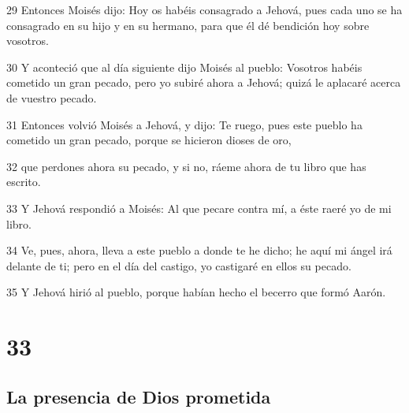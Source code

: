 \par 29 Entonces Moisés dijo: Hoy os habéis consagrado a Jehová, pues cada uno se ha consagrado en su hijo y en su hermano, para que él dé bendición hoy sobre vosotros.
\par 30 Y aconteció que al día siguiente dijo Moisés al pueblo: Vosotros habéis cometido un gran pecado, pero yo subiré ahora a Jehová; quizá le aplacaré acerca de vuestro pecado.
\par 31 Entonces volvió Moisés a Jehová, y dijo: Te ruego, pues este pueblo ha cometido un gran pecado, porque se hicieron dioses de oro,
\par 32 que perdones ahora su pecado, y si no, ráeme ahora de tu libro que has escrito.
\par 33 Y Jehová respondió a Moisés: Al que pecare contra mí, a éste raeré yo de mi libro.
\par 34 Ve, pues, ahora, lleva a este pueblo a donde te he dicho; he aquí mi ángel irá delante de ti; pero en el día del castigo, yo castigaré en ellos su pecado.
\par 35 Y Jehová hirió al pueblo, porque habían hecho el becerro que formó Aarón.

\chapter{33}

\section*{La presencia de Dios prometida}

